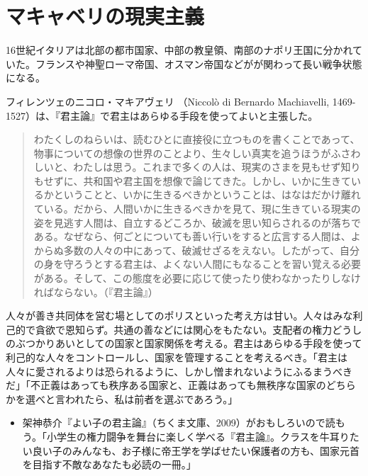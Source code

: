 \documentclass[uplatex,dvipdfmx]{jsarticle} \usepackage{mystyle}%
\begin{document}
\section{マキャベリの現実主義}

16世紀イタリアは北部の都市国家、中部の教皇領、南部のナポリ王国に分かれていた。フランスや神聖ローマ帝国、オスマン帝国などがが関わって長い戦争状態になる。

フィレンツェのニコロ・マキアヴェリ （Niccol{\`o} di Bernardo Machiavelli, 1469-1527）は、『君主論』で君主はあらゆる手段を使ってよいと主張した。


\begin{quote}
  わたくしのねらいは、読むひとに直接役に立つものを書くことであって、物事についての想像の世界のことより、生々しい真実を追うほうがふさわしいと、わたしは思う。これまで多くの人は、現実のさまを見もせず知りもせずに、共和国や君主国を想像で論じてきた。しかし、いかに生きているかということと、いかに生きるべきかということは、はなはだかけ離れている。だから、人間いかに生きるべきかを見て、現に生きている現実の姿を見逃す人間は、自立するどころか、破滅を思い知らされるのが落ちである。なぜなら、何ごとについても善い行いをすると広言する人間は、よからぬ多数の人々の中にあって、破滅せざるをえない。したがって、自分の身を守ろうとする君主は、よくない人間にもなることを習い覚える必要がある。そして、この態度を必要に応じて使ったり使わなかったりしなければならない。（『君主論』）
\end{quote}


人々が善き共同体を営む場としてのポリスといった考え方は甘い。人々はみな利己的で貪欲で恩知らず。共通の善などには関心をもたない。支配者の権力どうしのぶつかりあいとしての国家と国家関係を考える。君主はあらゆる手段を使って利己的な人々をコントロールし、国家を管理することを考えるべき。「君主は人々に愛されるよりは恐られるように、しかし憎まれないようにふるまうべきだ」「不正義はあっても秩序ある国家と、正義はあっても無秩序な国家のどちらかを選べと言われたら、私は前者を選ぶであろう。」



\begin{itemize}
\item 架神恭介『よい子の君主論』（ちくま文庫、2009）がおもしろいので読もう。「小学生の権力闘争を舞台に楽しく学べる『君主論』。クラスを牛耳りたい良い子のみんなも、お子様に帝王学を学ばせたい保護者の方も、国家元首を目指す不敵なあなたも必読の一冊。」
\end{itemize}






\ifx\mybook\undefined


\end{document}

